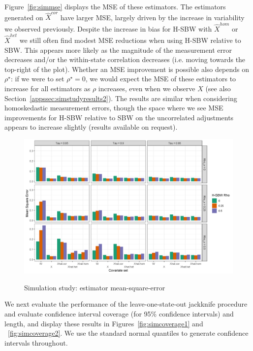 Figure~\ref{fig:simmse} displays the MSE of these estimators. The estimators generated on $\hat{X}^{cor}$ have larger MSE, largely driven by the increase in variability we observed previously. Despite the increase in bias for H-SBW with $\hat{X}^{hom}$ or $\hat{X}^{het}$ we still often find modest MSE reductions when using H-SBW relative to SBW. This appears more likely as the magnitude of the measurement error decreases and/or the within-state correlation decreases (i.e. moving towards the top-right of the plot). Whether an MSE improvement is possible also depends on $\rho^\star$: if we were to set $\rho^\star = 0$, we would expect the MSE of these estimators to increase for all estimators as $\rho$ increases, even when we observe $X$ (see also Section~\ref{appssec:simstudyresults2}). The results are similar when considering homoskedastic measurement errors, though the space where we see MSE improvements for H-SBW relative to SBW on the uncorrelated adjustments appears to increase slightly (results available on request). 

\begin{figure}[H]
\begin{center}
    \caption{Simulation study: estimator mean-square-error}\label{fig:simmse}
    \label{fig:loveplotc1}
    \includegraphics[scale=0.5]{01_Plots/mse-plot.png}
\end{center}
\end{figure}

We next evaluate the performance of the leave-one-state-out jackknife procedure and evaluate confidence interval coverage (for 95\% confidence intervals) and length, and display these results in Figures~\ref{fig:simcoverage1} and ~\ref{fig:simcoverage2}. We use the standard normal quantiles to generate confidence intervals throughout.


